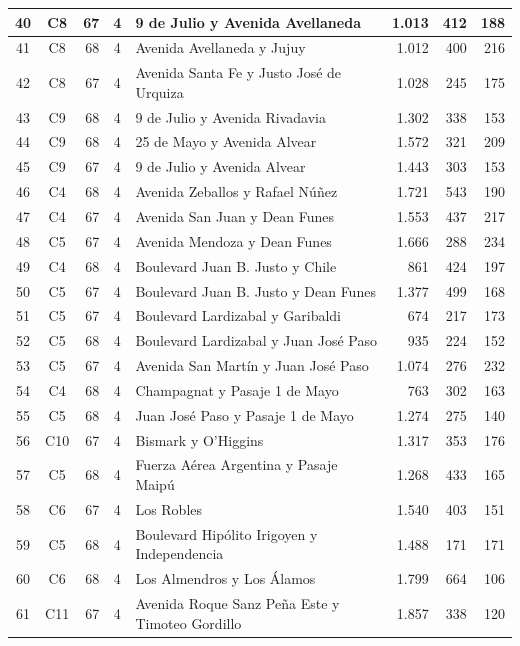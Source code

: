 \begin{longtable}{|c|c|r|c|p{4.2cm}|r|r|r|}
40 & C8 & 67 & 4 & 9 de Julio y Avenida Avellaneda & 1.013 & 412 & 188 \\ \hline
41 & C8 & 68 & 4 & Avenida Avellaneda y Jujuy & 1.012 & 400 & 216 \\ \hline
42 & C8 & 67 & 4 & Avenida Santa Fe y Justo José de Urquiza & 1.028 & 245 & 175 \\ \hline
43 & C9 & 68 & 4 & 9 de Julio y Avenida Rivadavia & 1.302 & 338 & 153 \\ \hline
44 & C9 & 68 & 4 & 25 de Mayo y Avenida Alvear & 1.572 & 321 & 209 \\ \hline
45 & C9 & 67 & 4 & 9 de Julio y Avenida Alvear & 1.443 & 303 & 153 \\ \hline
46 & C4 & 68 & 4 & Avenida Zeballos y Rafael Núñez & 1.721 & 543 & 190 \\ \hline
47 & C4 & 67 & 4 & Avenida San Juan y Dean Funes & 1.553 & 437 & 217 \\ \hline
48 & C5 & 67 & 4 & Avenida Mendoza y Dean Funes & 1.666 & 288 & 234 \\ \hline
49 & C4 & 68 & 4 & Boulevard Juan B. Justo y Chile & 861 & 424 & 197 \\ \hline
50 & C5 & 67 & 4 & Boulevard Juan B. Justo y Dean Funes & 1.377 & 499 & 168 \\ \hline
51 & C5 & 67 & 4 & Boulevard Lardizabal y Garibaldi & 674 & 217 & 173 \\ \hline
52 & C5 & 68 & 4 & Boulevard Lardizabal y Juan José Paso & 935 & 224 & 152 \\ \hline
53 & C5 & 67 & 4 & Avenida San Martín y Juan José Paso & 1.074 & 276 & 232 \\ \hline
54 & C4 & 68 & 4 & Champagnat y Pasaje 1 de Mayo & 763 & 302 & 163 \\ \hline
55 & C5 & 68 & 4 & Juan José Paso y Pasaje 1 de Mayo & 1.274 & 275 & 140 \\ \hline
56 & C10 & 67 & 4 & Bismark y O'Higgins & 1.317 & 353 & 176 \\ \hline
57 & C5 & 68 & 4 & Fuerza Aérea Argentina y Pasaje Maipú & 1.268 & 433 & 165 \\ \hline
58 & C6 & 67 & 4 & Los Robles & 1.540 & 403 & 151 \\ \hline
59 & C5 & 68 & 4 & Boulevard Hipólito Irigoyen y Independencia & 1.488 & 171 & 171 \\ \hline
60 & C6 & 68 & 4 & Los Almendros y Los Álamos & 1.799 & 664 & 106 \\ \hline
61 & C11 & 67 & 4 & Avenida Roque Sanz Peña Este y Timoteo Gordillo & 1.857 & 338 & 120 \\ \hline

\end{longtable}
